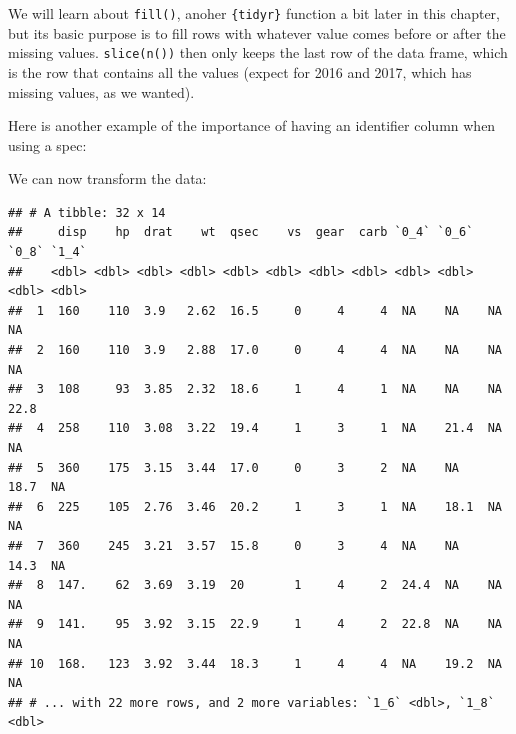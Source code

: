 \documentclass[]{gitbook}
\newenvironment{Shaded}{\begin{snugshade}}{\end{snugshade}}
\newcommand{\DataTypeTok}[1]{\textcolor[rgb]{0.13,0.29,0.53}{#1}}
\newcommand{\KeywordTok}[1]{\textcolor[rgb]{0.13,0.29,0.53}{\textbf{#1}}}
\newcommand{\NormalTok}[1]{#1}
\newcommand{\OperatorTok}[1]{\textcolor[rgb]{0.81,0.36,0.00}{\textbf{#1}}}
\newcommand{\OtherTok}[1]{\textcolor[rgb]{0.56,0.35,0.01}{#1}}
\newcommand{\StringTok}[1]{\textcolor[rgb]{0.31,0.60,0.02}{#1}}
\begin{document}
We will learn about \texttt{fill()}, anoher \texttt{\{tidyr\}} function a bit later in this chapter, but its basic
purpose is to fill rows with whatever value comes before or after the missing values. \texttt{slice(n())}
then only keeps the last row of the data frame, which is the row that contains all the values (expect
for 2016 and 2017, which has missing values, as we wanted).

Here is another example of the importance of having an identifier column when using a spec:

\begin{Shaded}
\end{Shaded}

We can now transform the data:

\begin{Shaded}
\end{Shaded}

\begin{verbatim}
## # A tibble: 32 x 14
##     disp    hp  drat    wt  qsec    vs  gear  carb `0_4` `0_6` `0_8` `1_4`
##    <dbl> <dbl> <dbl> <dbl> <dbl> <dbl> <dbl> <dbl> <dbl> <dbl> <dbl> <dbl>
##  1  160    110  3.9   2.62  16.5     0     4     4  NA    NA    NA    NA  
##  2  160    110  3.9   2.88  17.0     0     4     4  NA    NA    NA    NA  
##  3  108     93  3.85  2.32  18.6     1     4     1  NA    NA    NA    22.8
##  4  258    110  3.08  3.22  19.4     1     3     1  NA    21.4  NA    NA  
##  5  360    175  3.15  3.44  17.0     0     3     2  NA    NA    18.7  NA  
##  6  225    105  2.76  3.46  20.2     1     3     1  NA    18.1  NA    NA  
##  7  360    245  3.21  3.57  15.8     0     3     4  NA    NA    14.3  NA  
##  8  147.    62  3.69  3.19  20       1     4     2  24.4  NA    NA    NA  
##  9  141.    95  3.92  3.15  22.9     1     4     2  22.8  NA    NA    NA  
## 10  168.   123  3.92  3.44  18.3     1     4     4  NA    19.2  NA    NA  
## # ... with 22 more rows, and 2 more variables: `1_6` <dbl>, `1_8` <dbl>
\end{verbatim}
\end{document}
